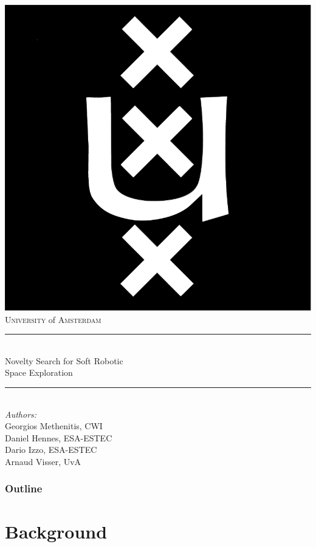\documentclass[6pt]{beamer}
\begin{document}
{\begin{frame}[plain]
\vspace{1cm}
\begin{center}
\includegraphics[height=.07\textwidth]{../Figures/Misc/University_of_Amsterdam_logo.pdf}\\
\textsc{University} of \textsc{Amsterdam}\\ \vspace{0.2cm}
\rule{\textwidth}{1pt}\\
{\Large Novelty Search for Soft Robotic\\ Space Exploration}\\[0.2cm] %
\rule{\textwidth}{0.5pt}\\ \vspace{0.4cm}
{\scriptsize \emph{ Authors:}}\\
Georgios Methenitis, CWI\\
Daniel Hennes,  ESA-ESTEC\\
Dario Izzo, ESA-ESTEC\\
Arnaud Visser, UvA
\end{center}
\end{frame}
}



\begin{frame}
\frametitle{Outline}
\tableofcontents
\end{frame}





\section{Background}
\end{document}
